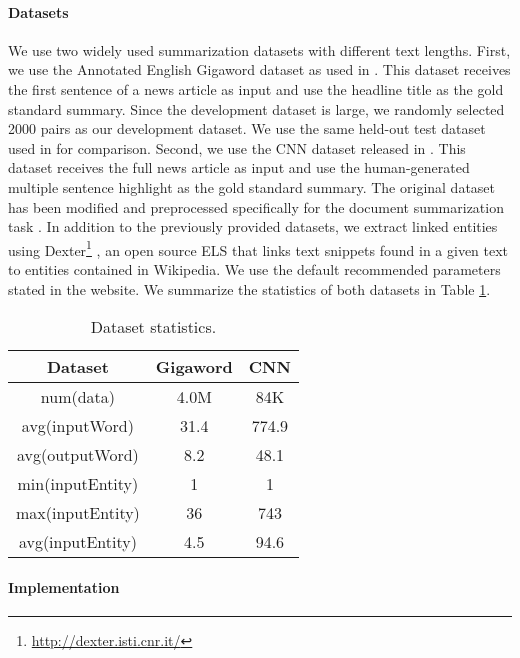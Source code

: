 \documentclass[11pt,a4paper]{article}
\begin{document}
\paragraph{Datasets}

We use two widely used summarization datasets with different text lengths. First, we use the Annotated English Gigaword dataset as used in \cite{rush2015neural}.
This dataset receives the first sentence of a news article as input and use the headline title as the gold standard summary.
Since the development dataset is large, we randomly selected 2000 pairs as our development dataset. We use the same held-out test dataset used in \cite{rush2015neural} for comparison.
Second, we use the CNN dataset released in \cite{hermann2015teaching}.
This dataset receives the full news article as input and use the human-generated multiple sentence highlight as the gold standard summary.
The original dataset has been modified and preprocessed specifically for the document summarization task \cite{nallapati2016abstractive}.
In addition to the previously provided datasets, we extract linked entities using Dexter\footnote{\url{http://dexter.isti.cnr.it/}} \cite{ceccarelli2013dexter}, an open source ELS that links text snippets found in a given text to entities contained in Wikipedia. 
We use the default recommended parameters stated in the website.
We summarize the statistics of both datasets in Table \ref{tab:statistics}.

\begin{table}[t]
\centering
    \begin{tabular}{|c|cc|}
    \hline
    Dataset & Gigaword & CNN \\
    \hline
    num(data) & 4.0M  & 84K \\
    avg(inputWord) & 31.4  & 774.9 \\
    avg(outputWord) & 8.2   & 48.1 \\
    \hline
    min(inputEntity) & 1     & 1 \\
    max(inputEntity) & 36    & 743 \\
    avg(inputEntity) & 4.5   & 94.6 \\
    \hline
    \end{tabular}\caption{Dataset statistics.}
  \label{tab:statistics}\end{table}

\paragraph{Implementation}
\end{document}
